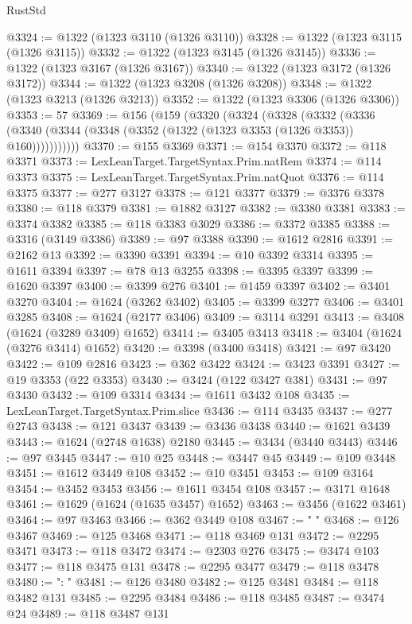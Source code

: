 \begin{lexlean}{RustStd}
\begin{coremodule}
@3324 := @1322 (@1323 @3110 (@1326 @3110))
@3328 := @1322 (@1323 @3115 (@1326 @3115))
@3332 := @1322 (@1323 @3145 (@1326 @3145))
@3336 := @1322 (@1323 @3167 (@1326 @3167))
@3340 := @1322 (@1323 @3172 (@1326 @3172))
@3344 := @1322 (@1323 @3208 (@1326 @3208))
@3348 := @1322 (@1323 @3213 (@1326 @3213))
@3352 := @1322 (@1323 @3306 (@1326 @3306))
@3353 := 57
@3369 := @156
    (@159
      (@3320
        (@3324
          (@3328
            (@3332
              (@3336 (@3340 (@3344 (@3348 (@3352 (@1322 (@1323 @3353 (@1326 @3353)) @160)))))))))))
@3370 := @155 @3369
@3371 := @154 @3370
@3372 := @118 @3371
@3373 := LexLeanTarget.TargetSyntax.Prim.natRem
@3374 := @114 @3373
@3375 := LexLeanTarget.TargetSyntax.Prim.natQuot
@3376 := @114 @3375
@3377 := @277 @3127
@3378 := @121 @3377
@3379 := @3376 @3378
@3380 := @118 @3379
@3381 := @1882 @3127
@3382 := @3380 @3381
@3383 := @3374 @3382
@3385 := @118 @3383 @3029
@3386 := @3372 @3385
@3388 := @3316 (@3149 @3386)
@3389 := @97 @3388
@3390 := @1612 @2816
@3391 := @2162 @13
@3392 := @3390 @3391
@3394 := @10 @3392 @3314
@3395 := @1611 @3394
@3397 := @78 @13 @3255
@3398 := @3395 @3397
@3399 := @1620 @3397
@3400 := @3399 @276
@3401 := @1459 @3397
@3402 := @3401 @3270
@3404 := @1624 (@3262 @3402)
@3405 := @3399 @3277
@3406 := @3401 @3285
@3408 := @1624 (@2177 @3406)
@3409 := @3114 @3291
@3413 := @3408 (@1624 (@3289 @3409) @1652)
@3414 := @3405 @3413
@3418 := @3404 (@1624 (@3276 @3414) @1652)
@3420 := @3398 (@3400 @3418)
@3421 := @97 @3420
@3422 := @109 @2816
@3423 := @362 @3422
@3424 := @3423 @3391
@3427 := @19 @3353 (@22 @3353)
@3430 := @3424 (@122 @3427 @381)
@3431 := @97 @3430
@3432 := @109 @3314
@3434 := @1611 @3432 @108
@3435 := LexLeanTarget.TargetSyntax.Prim.slice
@3436 := @114 @3435
@3437 := @277 @2743
@3438 := @121 @3437
@3439 := @3436 @3438
@3440 := @1621 @3439
@3443 := @1624 (@2748 @1638) @2180
@3445 := @3434 (@3440 @3443)
@3446 := @97 @3445
@3447 := @10 @25
@3448 := @3447 @45
@3449 := @109 @3448
@3451 := @1612 @3449 @108
@3452 := @10 @3451
@3453 := @109 @3164
@3454 := @3452 @3453
@3456 := @1611 @3454 @108
@3457 := @3171 @1648
@3461 := @1629 (@1624 (@1635 @3457) @1652)
@3463 := @3456 (@1622 @3461)
@3464 := @97 @3463
@3466 := @362 @3449 @108
@3467 := "      "
@3468 := @126 @3467
@3469 := @125 @3468
@3471 := @118 @3469 @131
@3472 := @2295 @3471
@3473 := @118 @3472
@3474 := @2303 @276
@3475 := @3474 @103
@3477 := @118 @3475 @131
@3478 := @2295 @3477
@3479 := @118 @3478
@3480 := ": "
@3481 := @126 @3480
@3482 := @125 @3481
@3484 := @118 @3482 @131
@3485 := @2295 @3484
@3486 := @118 @3485
@3487 := @3474 @24
@3489 := @118 @3487 @131

\end{coremodule}
\end{lexlean}
